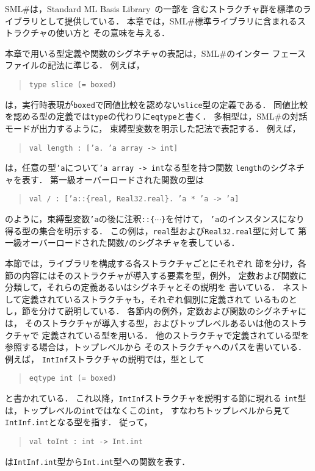 \documentclass{jbook}
\newif\ifjp
\newcommand{\smlsharp}{SML\#}
\begin{document}
{\ifjp%
\else%
\fi%


	\smlsharp{}は，Standard ML Basis Library~\cite{smlbasis}の一部を
含むストラクチャ群を標準のライブラリとして提供している．
	本章では，\smlsharp{}標準ライブラリに含まれるストラクチャの使い方と
その意味を与える．

	本章で用いる型定義や関数のシグネチャの表記は，\smlsharp{}のインター
フェースファイルの記法に準じる．
	例えば，
\begin{quote}
\tt type slice (= boxed)
\end{quote}
は，実行時表現が{\tt boxed}で同値比較を認めない{\tt slice}型の定義である．
	同値比較を認める型の定義では{\tt type}の代わりに{\tt eqtype}と書く．
	多相型は，\smlsharp{}の対話モードが出力するように，
束縛型変数を明示した記法で表記する．
	例えば，
\begin{quote}
\tt val length :~['a.~'a array -> int]
\end{quote}
は，任意の型{\tt 'a}について{\tt 'a array -> int}なる型を持つ関数
{\tt length}のシグネチャを表す．
	第一級オーバーロードされた関数の型は
\begin{quote}
\tt val / :~['a::\{real, Real32.real\}.~'a * 'a -> 'a]
\end{quote}
のように，束縛型変数{\tt 'a}の後に注釈{\tt ::\{$\cdots$\}}を付けて，
{\tt 'a}のインスタンスになり得る型の集合を明示する．
	この例は，{\tt real}型および{\tt Real32.real}型に対して
第一級オーバーロードされた関数{\tt /}のシグネチャを表している．

	本節では，ライブラリを構成する各ストラクチャごとにそれぞれ
節を分け，各節の内容にはそのストラクチャが導入する要素を型，例外，
定数および関数に分類して，それらの定義あるいはシグネチャとその説明を
書いている．
	ネストして定義されているストラクチャも，それぞれ個別に定義されて
いるものとし，節を分けて説明している．
	各節内の例外，定数および関数のシグネチャには，
そのストラクチャが導入する型，およびトップレベルあるいは他のストラクチャで
定義されている型を用いる．
	他のストラクチャで定義されている型を参照する場合は，トップレベルから
そのストラクチャへのパスを書いている．
	例えば，
{\tt IntInf}ストラクチャの説明では，型として
\begin{quote}
\tt eqtype int (= boxed)
\end{quote}
と書かれている．
	これ以降，{\tt IntInf}ストラクチャを説明する節に現れる
{\tt int}型は，トップレベルの{\tt int}ではなくこの{\tt int}，
すなわちトップレベルから見て{\tt IntInf.int}となる型を指す．
	従って，
\begin{quote}
\tt val toInt :~int -> Int.int
\end{quote}
は{\tt IntInf.int}型から{\tt Int.int}型への関数を表す．

}
\end{document}
